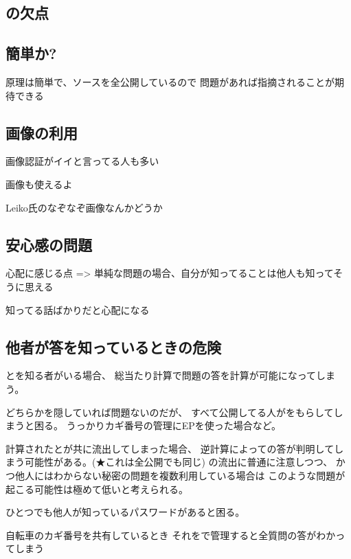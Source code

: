 \documentclass[twoside]{wiss}
\begin{document}

\subsection{{\EP}の欠点}

\subsection{簡単か?}

原理は簡単で、ソースを全公開しているので
問題があれば指摘されることが期待できる

\subsection{画像の利用}

画像認証がイイと言ってる人も多い

画像も使えるよ

Leiko氏のなぞなぞ画像なんかどうか

\subsection{安心感の問題} 

心配に感じる点
 => 単純な問題の場合、自分が知ってることは他人も知ってそうに思える

知ってる話ばかりだと心配になる

\subsection{他者が答を知っているときの危険}

{\PW}と{\SS}を知る者がいる場合、
総当たり計算で問題の答を計算が可能になってしまう。

どちらかを隠していれば問題ないのだが、
すべて公開してる人が{\PW}をもらしてしまうと困る。
うっかりカギ番号の管理にEPを使った場合など。

計算された{\PW}と{\SS}が共に流出してしまった場合、
逆計算によって{\SQ}の答が判明してしまう可能性がある。(★これは全公開でも同じ)
{\PW}の流出に普通に注意しつつ、
かつ他人にはわからない秘密の問題を複数利用している場合は
このような問題が起こる可能性は極めて低いと考えられる。

ひとつでも他人が知っているパスワードがあると困る。

自転車のカギ番号を共有しているとき
それを{\EP}で管理すると全質問の答がわかってしまう
\end{document}
